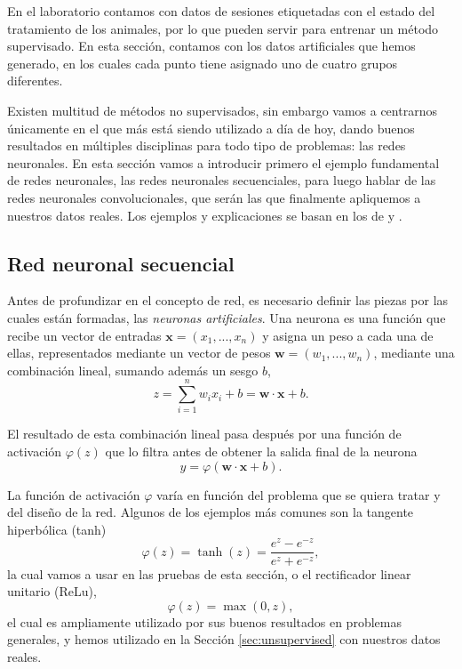 En el laboratorio contamos con datos de sesiones etiquetadas con el estado del tratamiento de los animales, por lo que pueden servir para entrenar un método supervisado. En esta sección, contamos con los datos artificiales que hemos generado, en los cuales cada punto tiene asignado uno de cuatro grupos diferentes.

Existen multitud de métodos no supervisados, sin embargo vamos a centrarnos únicamente en el que más está siendo utilizado a día de hoy, dando buenos resultados en múltiples disciplinas para todo tipo de problemas: las redes neuronales. En esta sección vamos a introducir primero el ejemplo fundamental de redes neuronales, las redes neuronales secuenciales, para luego hablar de las redes neuronales convolucionales, que serán las que finalmente apliquemos a nuestros datos reales. Los ejemplos y explicaciones se basan en los de \cite{understanding} y \cite{pytorch}.

\subsection{Red neuronal secuencial}

Antes de profundizar en el concepto de red, es necesario definir las piezas por las cuales están formadas, las \textit{neuronas artificiales}. Una neurona es una función que recibe un vector de entradas $ \mathbf{x} = (x_1, ..., x_n) $ y asigna un peso a cada una de ellas, representados mediante un vector de pesos $ \mathbf{w} = (w_1, ..., w_n) $, mediante una combinación lineal, sumando además un sesgo $ b $,
\begin{equation}
  z = \sum_{i=1}^n w_i x_i + b = \mathbf{w} \cdot \mathbf{x} + b.
\end{equation}

El resultado de esta combinación lineal pasa después por una función de activación $ \varphi(z) $ que lo filtra antes de obtener la salida final de la neurona
\begin{equation}
  y = \varphi(\mathbf{w} \cdot \mathbf{x} + b).
\end{equation}

La función de activación $ \varphi $ varía en función del problema que se quiera tratar y del diseño de la red. Algunos de los ejemplos más comunes son la tangente hiperbólica (tanh)
\begin{equation}
  \varphi(z) = \operatorname{tanh}(z) = \frac{e^z - e^{-z}}{e^z + e^{-z}},
\end{equation}
la cual vamos a usar en las pruebas de esta sección, o el rectificador linear unitario (ReLu),
\begin{equation}
  \varphi(z) = \operatorname{max}(0, z),
\end{equation}
el cual es ampliamente utilizado por sus buenos resultados en problemas generales, y hemos utilizado en la Sección \ref{sec:unsupervised} con nuestros datos reales.

